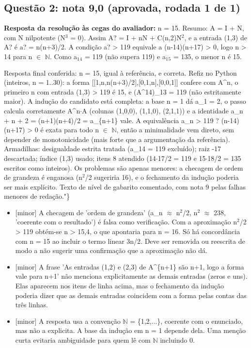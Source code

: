 \documentclass{article}%
\begin{document}
\subsection*{Questão 2: nota 9,0 (aprovada, rodada 1 de 1)}%
\textbf{Resposta da resolução às cegas do avaliador:} n = 15.\newline%
\newline%
Resumo: A = I + N, com N nilpotente (N$^3$ = 0). Assim A? = I + nN + C(n,2)N$^2$, e a entrada (1,3) de A? é a? = n(n+3)/2. A condição a? > 119 equivale a (n-14)(n+17) > 0, logo n > 14 para n $\in$ $\mathbb{N}$. Como a$_{1}$$_{4}$ = 119 (não supera 119) e a$_{1}$$_{5}$ = 135, o menor n é 15.\par %
Resposta final conferida: n = 15, igual à referência, e correta. Refiz no Python (inteiros, n = 1..30): a forma {[}{[}1,n,n(n+3)/2{]},{[}0,1,n{]},{[}0,0,1{]}{]} confere com A\^{}n, o primeiro n com entrada (1,3) > 119 é 15, e (A\^{}14)\_13 = 119 (não estritamente maior). A indução do candidato está completa: a base n = 1 dá a\_1 = 2, o passo calcula corretamente A\^{}n$\cdot$A (colunas (1,0,0), (1,1,0), (2,1,1)) e a identidade a\_n + n + 2 = (n+1)(n+4)/2 = a\_\{n+1\} vale. A equivalência a\_n > 119 ? (n-14)(n+17) > 0 é exata para todo n $\in$ $\mathbb{N}$, então a minimalidade vem direto, sem depender de monotonicidade (mais forte que a argumentação da referência). Armadilhas: desigualdade estrita tratada (a\_14 = 119 excluído); raiz -17 descartada; índice (1,3) usado; itens 8 atendido (14$\cdot$17/2 = 119 e 15$\cdot$18/2 = 135 escritos como inteiros). Os problemas são apenas menores: a checagem de ordem de grandeza é enganosa (n$^2$/2 sugeriria 16), e o fechamento da indução poderia ser mais explícito. Texto de nível de gabarito comentado, com nota 9 pelas falhas menores de redação."\}%
\begin{itemize}%
\item%
{[}minor{]} A checagem de 'ordem de grandeza' (a\_n $\approx$ n$^2$/2, n$^2$ $\approx$ 238, 'coerente com o resultado') é falsa como verificação. Com a aproximação n$^2$/2 > 119 obtém{-}se n > 15,4, o que apontaria para n = 16. Só há concordância com n = 15 ao incluir o termo linear 3n/2. Deve ser removida ou reescrita de modo a não sugerir uma confirmação que a aproximação não dá.%
\item%
{[}minor{]} A frase 'As entradas (1,2) e (2,3) de A\^{}\{n+1\} são n+1, logo a forma vale para n+1' não menciona explicitamente as demais entradas (zeros e uns). Elas aparecem nos itens de linha acima, mas o fechamento da indução poderia dizer que as demais entradas coincidem com a forma pelas contas das três linhas.%
\item%
{[}minor{]} A resposta usa a convenção $\mathbb{N}$ = \{1,2,...\}, coerente com o enunciado, mas não a explicita. A base da indução em n = 1 depende dela. Uma menção curta evitaria ambiguidade para quem lê com $\mathbb{N}$ incluindo 0.%
\end{itemize}%
\end{document}
